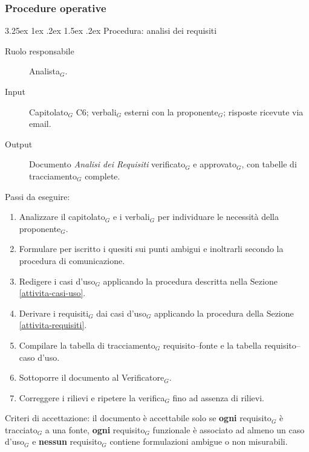 \documentclass[a4paper, 10pt]{article}
\makeatletter
\renewcommand\paragraph{\@startsection{paragraph}{4}{\z@}%
  {3.25ex \@plus1ex \@minus .2ex}%
  {1.5ex \@plus .2ex}%
  {\normalfont\normalsize\bfseries}}
\makeatother
\begin{document}
\subsubsection{Procedure operative}

\paragraph{Procedura: analisi dei requisiti}

\begin{description}
    \item[Ruolo responsabile] Analista$_G$.
    \item[Input] Capitolato$_G$ C6; verbali$_G$ esterni con la proponente$_G$; risposte ricevute via email.
    \item[Output] Documento \textit{Analisi dei Requisiti} verificato$_G$ e approvato$_G$, con tabelle di tracciamento$_G$ complete.
\end{description}

\noindent Passi da eseguire:
\begin{enumerate}
    \item Analizzare il capitolato$_G$ e i verbali$_G$ per individuare le necessità della proponente$_G$.
    \item Formulare per iscritto i quesiti sui punti ambigui e inoltrarli secondo la procedura di comunicazione.
    \item Redigere i casi d'uso$_G$ applicando la procedura descritta nella Sezione \ref{attivita-casi-uso}.
    \item Derivare i requisiti$_G$ dai casi d'uso$_G$ applicando la procedura della Sezione \ref{attivita-requisiti}.
    \item Compilare la tabella di tracciamento$_G$ requisito--fonte e la tabella requisito--caso d'uso.
    \item Sottoporre il documento al Verificatore$_G$.
    \item Correggere i rilievi e ripetere la verifica$_G$ fino ad assenza di rilievi.
\end{enumerate}

\noindent Criteri di accettazione: il documento è accettabile solo se \textbf{ogni} requisito$_G$ è tracciato$_G$ a una fonte, \textbf{ogni} requisito$_G$ funzionale è associato ad almeno un caso d'uso$_G$ e \textbf{nessun} requisito$_G$ contiene formulazioni ambigue o non misurabili.
\end{document}
